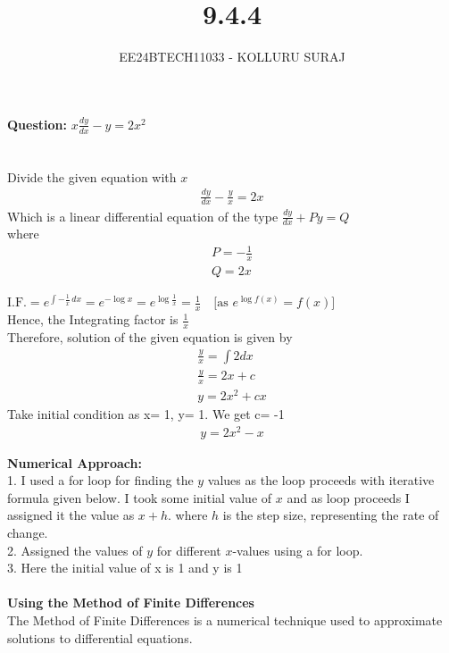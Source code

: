 \documentclass[journal]{IEEEtran}
\numberwithin{equation}{enumi}
\numberwithin{figure}{enumi}
\begin{document}

\title{9.4.4}
\author{EE24BTECH11033 - KOLLURU SURAJ}
{\let\newpage\relax\maketitle}
\textbf{Question:} 
$x\frac{dy}{dx}-y=2x^2$
\\\\
\solution\\
Divide the given equation with $x$
\begin{align}
    \frac{dy}{dx}-\frac{y}{x}=2x\label{1} 
\end{align}
Which is a linear differential equation of the type $\frac{dy}{dx} +Py=Q$\\ where
\begin{align}
P= -\frac{1}{x}\\
Q=2x
\end{align}

$\text{I.F.} = e^{\int -\frac{1}{x} \, dx} = e^{-\log x} = e^{\log \frac{1}{x}} = \frac{1}{x} \quad \text{[as } e^{\log f(x)} = f(x) \text{]}$\\

Hence, the Integrating factor is $\frac{1}{x}$\\
Therefore, solution of the given equation is given by\\
\begin{align}
    \frac{y}{x}=\int 2dx\\
    \frac{y}{x}=2x+c\\
    y=2x^2+cx
\end{align}
Take initial condition as x= 1, y= 1. We get c= -1
\begin{align}
    y=2x^2- x
\end{align}


\noindent\textbf{Numerical Approach:}\\1. I used a for loop for finding the $y$ values as the loop proceeds with iterative formula given below. I took some initial value of $x$ and as loop proceeds I assigned it the value as $x+h$. where $h$ is the step size, representing the rate of change. 
\\2. Assigned the values of $y$ for different $x$-values using a for loop. \\ 
3. Here the initial value of x is 1 and y is 1\\
\\ \textbf{Using the Method of Finite Differences}\\
The Method of Finite Differences is a numerical technique used to approximate solutions to differential equations. 
\end{document}
